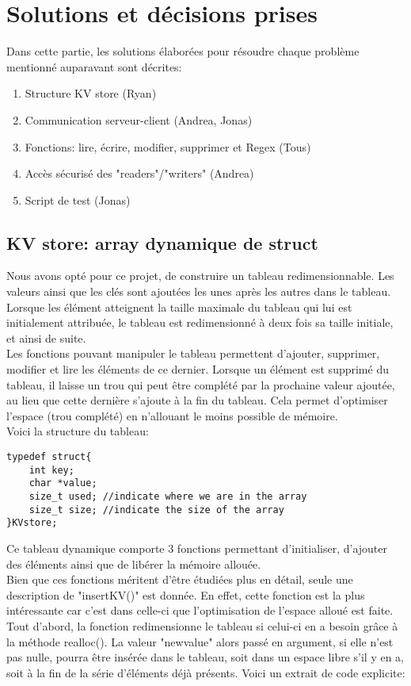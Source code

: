 \documentclass[11pt,a4paper]{article}
\begin{document}
\section{Solutions et décisions prises}
Dans cette partie, les solutions élaborées pour résoudre chaque problème mentionné auparavant sont décrites:

\begin{enumerate}
\item Structure KV store (Ryan)
\item Communication serveur-client (Andrea, Jonas)
\item Fonctions: lire, écrire, modifier, supprimer  et Regex (Tous)
\item Accès sécurisé des "readers"/"writers" (Andrea)
\item Script de test (Jonas)
\end{enumerate}

\newpage
\subsection{KV store: array dynamique de struct}
Nous avons opté pour ce projet, de construire un tableau redimensionnable. Les valeurs ainsi que les clés sont ajoutées les unes après les autres dans le tableau. Lorsque les élément atteignent la taille maximale du tableau qui lui est initialement attribuée, le tableau est redimensionné à deux fois sa taille initiale, et ainsi de suite.\\
Les fonctions pouvant manipuler le tableau permettent d'ajouter, supprimer, modifier et  lire les éléments de ce dernier. Lorsque un élément est supprimé du tableau, il laisse un trou qui peut être complété par la prochaine valeur ajoutée, au lieu que cette dernière s'ajoute à la fin du tableau. Cela permet d'optimiser l'espace (trou complété) en n'allouant le moins possible de mémoire.\\
Voici la structure du tableau:

\begin{lstlisting}
typedef struct{
    int key; 
    char *value;
    size_t used; //indicate where we are in the array
    size_t size; //indicate the size of the array
}KVstore;
\end{lstlisting}

Ce tableau dynamique comporte 3 fonctions permettant d'initialiser, d'ajouter des éléments ainsi que de libérer la mémoire allouée. \\
Bien que ces fonctions méritent d'être étudiées plus en détail, seule une description de "insertKV()" est donnée. En effet, cette fonction est la plus intéressante car c'est dans celle-ci que l'optimisation de l'espace alloué est faite.\\
Tout d'abord, la fonction redimensionne le tableau si celui-ci en a besoin  grâce à la méthode realloc(). La valeur "newvalue" alors passé en argument, si elle n'est pas nulle,  pourra être insérée dans le tableau, soit dans un espace libre s'il y en a, soit à la fin de la série d'éléments déjà présents. Voici un extrait de code explicite:
\end{document}
